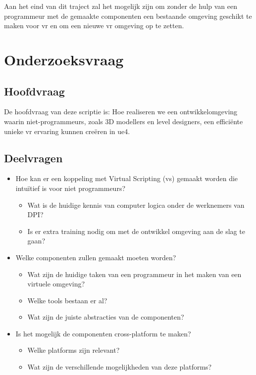 Aan het eind van dit traject zal het mogelijk zijn om zonder de hulp van een programmeur met de gemaakte componenten een bestaande omgeving geschikt te maken voor \gls{vr} en om een nieuwe \gls{vr} omgeving op te zetten.

\section{Onderzoeksvraag}

\subsection{Hoofdvraag}

De hoofdvraag van deze scriptie is: Hoe realiseren we een ontwikkelomgeving waarin niet-programmeurs, zoals 3D modellers en level designers, een efficiënte unieke \gls{vr} ervaring kunnen creëren in \gls{ue4}.

\subsection{Deelvragen}

\begin{itemize}  
\item Hoe kan er een koppeling met Virtual Scripting (\gls{vs}) gemaakt worden die intuïtief is voor niet programmeurs? 
	\begin{itemize}
	\item Wat is de huidige kennis van computer logica onder de werknemers van DPI?
	\item Is er extra training nodig om met de ontwikkel omgeving aan de slag te gaan?
	\end{itemize}
\item Welke componenten zullen gemaakt moeten worden?
	\begin{itemize}
	\item Wat zijn de huidige taken van een programmeur in het maken van een virtuele omgeving?
	\item Welke tools bestaan er al?
	\item Wat zijn de juiste abstracties van de componenten? 
	\end{itemize}
\item Is het mogelijk de componenten cross-platform te maken?
	\begin{itemize}
	\item Welke platforms zijn relevant?
	\item Wat zijn de verschillende mogelijkheden van deze platforms?
	\end{itemize}
\end{itemize}

